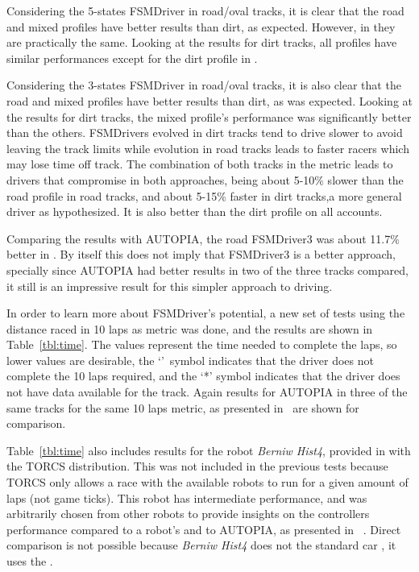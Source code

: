 Considering the 5-states FSMDriver in road/oval tracks, it is clear that the road and mixed profiles have better results than dirt, as expected. However, in  they are practically the same.  Looking at the results for dirt tracks, all profiles have similar performances except for the dirt profile in . 

Considering the 3-states FSMDriver in road/oval tracks, it is also clear that the road and mixed profiles have better results than dirt, as was expected. Looking at the results for dirt tracks, the mixed profile's performance was significantly better than the others. FSMDrivers evolved in dirt tracks tend to drive slower to avoid leaving the track limits while evolution in road tracks leads to faster racers which may lose time off track. The combination of both tracks in the metric leads to drivers that compromise in both approaches, being about 5-10\% slower than the road profile in road tracks, and about 5-15\% faster in dirt tracks,a more general driver as hypothesized. It is also better than the dirt profile on all accounts.

Comparing the results with AUTOPIA, the road FSMDriver3 was about 11.7\% better in . By itself this does not imply that FSMDriver3 is a better approach, specially since AUTOPIA had better results in two of the three tracks compared, it still is an impressive result for this simpler approach to driving.

In order to learn more about FSMDriver's potential, a new set of tests using the distance raced in 10 laps as metric was done, and the results are shown in Table~\ref{tbl:time}. The values represent the time needed to complete the laps, so lower values are desirable, the `\textdagger'~symbol indicates that the driver does not complete the 10 laps required, and the `*' symbol indicates that the driver does not have data available for the track. Again results for AUTOPIA in three of the same tracks for the same 10 laps metric, as presented in~\cite{AUTOPIA} are shown for comparison.

Table~\ref{tbl:time} also includes results for the robot \emph{Berniw Hist4}, provided in with the TORCS distribution. This was not included in the previous tests because TORCS only allows a race with the available robots to run for a given amount of laps (not game ticks). This robot has intermediate performance, and was arbitrarily chosen from other robots to provide insights on the controllers performance compared to a robot's and to AUTOPIA, as presented in ~\cite{AUTOPIA}. Direct comparison is not possible because \emph{Berniw Hist4} does not the standard car , it uses the .

